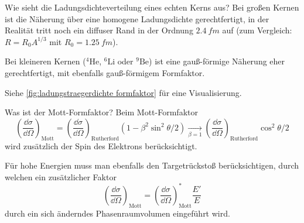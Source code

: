 
\begin{fquestion}{Wie sieht die Ladungsdichteverteilung eines echten Kerns aus?}
    Bei großen Kernen ist die Näherung über eine homogene Ladungsdichte gerechtfertigt, in der Realität tritt noch ein diffuser Rand in der Ordnung $\SI{2.4}{fm}$ auf (zum Vergleich: $R = R_0 A^{1/3}$ mit $R_0 = \SI{1.25}{fm}$). 
    
    Bei kleineren Kernen (${}^4\mathrm{He}$, ${}^6\mathrm{Li}$ oder ${}^9\mathrm{Be}$) ist eine gauß-förmige Näherung eher gerechtfertigt, mit ebenfalls gauß-förmigem Formfaktor.
    
    Siehe \autoref{fig:ladungstraegerdichte formfaktor} für eine Visualisierung.
\end{fquestion}

\begin{fquestion}{Was ist der Mott-Formfaktor?}
    Beim Mott-Formfaktor 
    $$\left(\frac{\dd \sigma}{\dd \Omega}\right)_{\mathrm{Mott}} = \left(\frac{\dd \sigma}{\dd \Omega}\right)_{\mathrm{Rutherford}} (1 - \beta^2 \sin^2 \theta / 2) \xrightarrow[\beta = 1]{} \left(\frac{\dd \sigma}{\dd \Omega}\right)_{\mathrm{Rutherford}} \cos^2 \theta / 2 $$
    wird zusätzlich der Spin des Elektrons berücksichtigt.
    
    Für hohe Energien muss man ebenfalls den Targetrückstoß berücksichtigen, durch welchen ein zusätzlicher Faktor
    $$\left(\frac{\dd \sigma}{\dd \Omega}\right)_{\mathrm{Mott}} = \left(\frac{\dd \sigma}{\dd \Omega}\right)_{\mathrm{Mott}}^* \frac{E'}{E}$$
    durch ein sich änderndes Phasenraumvolumen eingeführt wird.
\end{fquestion}



